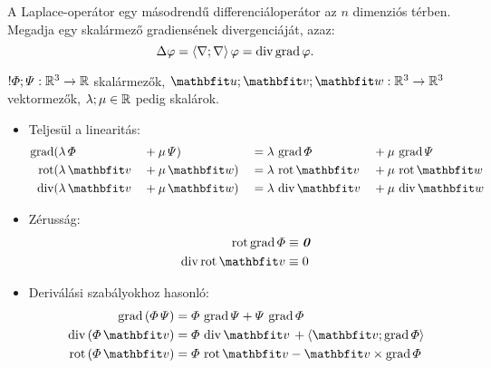 \documentclass{szb-practice}
\begin{document}
\begin{definition}
  A Laplace-operátor egy másodrendű differenciáloperátor az $n$ dimenziós
  térben. Megadja egy skalármező gradiensének divergenciáját, azaz:
  $$
    \Delta \varphi
    = \left\langle\nabla;\nabla\right\rangle \varphi
    = \operatorname{div} \operatorname{grad} \varphi
    \text.
  $$
\end{definition}

\begin{blueBox}[][nobreak]
  $! \varPhi; \varPsi : \mathbb{R}^3 \rightarrow \mathbb{R}$ skalármezők,
  $\rvec u; \rvec v; \rvec w : \Reals^3 \rightarrow \Reals^3$
  vektormezők, $\lambda; \mu \in \mathbb{R}$ pedig skalárok.
  \begin{itemize}
    \item Teljesül a linearitás:
          \vspace{-.5em}
          \begin{alignat*}{4}
            \grad & (\lambda \, \varPhi && + \mu \, \varPsi) && = \lambda \, \grad \varPhi && + \mu \, \grad \varPsi
            \\
            \rot  & (\lambda \, \rvec v && + \mu \, \rvec w) && = \lambda \, \rot \rvec v  && + \mu \, \rot \rvec w
            \\
            \Div  & (\lambda \, \rvec v && + \mu \, \rvec w) && = \lambda \, \Div \rvec v  && + \mu \, \Div \rvec w
          \end{alignat*}

    \item Zérusság:
          \vspace{-.5em}
          \begin{alignat*}{1}
            \rot \grad \varPhi & \equiv \nvec
            \\
            \Div \rot \rvec v  & \equiv 0
          \end{alignat*}

    \item Deriválási szabályokhoz hasonló:
          \vspace{-.5em}
          \begin{align*}
            \grad \left( \varPhi \, \varPsi \right)
             & = \varPhi \, \grad \varPsi
            + \varPsi \, \grad \varPhi
            \\
            \Div \left( \varPhi \, \rvec v \right)
             & = \varPhi \, \Div \rvec v \,
            + \scalar{\rvec v}{\grad \varPhi}
            \\
            \rot \left( \varPhi \, \rvec v \right)
             & = \varPhi \, \rot \rvec v
            - \rvec v \times \grad \varPhi
          \end{align*}


\end{itemize}
\end{blueBox}
\end{document}
